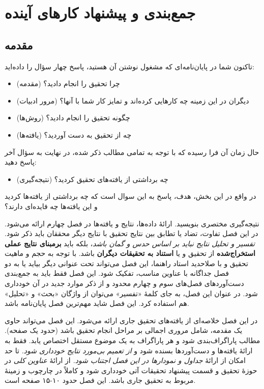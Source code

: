 \chapter{جمع‌بندی و پیشنهاد کارهای آینده}

\section{مقدمه}
تاکنون شما در پایان‌نامه‌ای که مشغول نوشتن آن هستید، پاسخ چهار سؤال را داده‌اید:
\begin{itemize}
	\item
	چرا تحقیق را انجام دادید؟ (مقدمه)
	\item
	دیگران در این زمینه‌ چه کارهایی کرده‌اند و تمایز کار شما با آنها؟ (مرور ادبیات)
	\item
	چگونه تحقیق را انجام دادید؟ (روش‌ها)
	\item
	چه از تحقیق به دست آوردید؟ (یافته‌ها)
\end{itemize}
حال زمان آن فرا رسیده که با توجه به تمامی مطالب ذکر شده، در نهایت به سؤال آخر پاسخ دهید:
\begin{itemize}
	\item
	چه برداشتی از یافته‌های تحقیق کردید؟ (نتیجه‌گیری)
\end{itemize}
در واقع در این بخش، هدف، پاسخ به این سوال است که چه برداشتی از یافته‌ها کردید و این یافته‌ها چه فایده‌ای دارند؟

نتیجه‌گیری مختصری بنویسید. ارائهٔ داده‌ها، نتایج و یافته‌ها در فصل چهارم ارائه می‌شود. در این فصل تفاوت، تضاد یا تطابق بین نتایج تحقیق با نتایج دیگر محققان باید ذکر شود.
\emph{تفسیر و تحلیل نتایج نباید بر اساس حدس و گمان باشد}،
بلکه باید
\textbf{برمبنای نتایج عملی استخراج‌شده}
از تحقیق و یا
\textbf{استناد به تحقیقات دیگران}
باشد.
با توجه به حجم و ماهیت تحقیق و با صلاحدید استاد راهنما، این فصل می‌تواند تحت عنوانی دیگر بیاید یا به دو فصل جداگانه با عناوین مناسب، تفکیک شود. این فصل فقط باید به جمع‌بندی دست‌آوردهای فصل‌های سوم و چهارم محدود و از ذکر موارد جدید در آن خودداری شود. در عنوان این فصل، به جای کلمهٔ «تفسیر» می‌توان از واژگان «بحث» و «تحلیل» هم استفاده کرد. این فصل شاید مهم‌ترین فصل پایان‌نامه باشد.

در این فصل خلاصه‌ای از یافته‌های تحقیق جاری ارائه می‌شود. این فصل می‌تواند حاوی یک مقدمه، شامل مروری اجمالی بر مراحل انجام تحقیق باشد (حدود یک صفحه). مطالب پاراگراف‌بندی شود و هر پاراگراف به یک موضوع مستقل اختصاص یابد. فقط به ارائهٔ یافته‌ها و دست‌آوردها بسنده شود و
\emph{از تعمیم بی‌مورد نتایج خودداری شود.}
تا حد امکان از ارائهٔ 
\emph{جداول و نمودارها در این فصل اجتناب شود.}
از ارائهٔ 
\emph{عناوین کلی}
در حوزهٔ تحقیق و قسمت پیشنهاد تحقیقات آتی خودداری شود و کاملاً در چارچوب و زمینهٔ مربوط به تحقیق جاری باشد. این فصل حدود ۱۰-۱۵ صفحه است.

